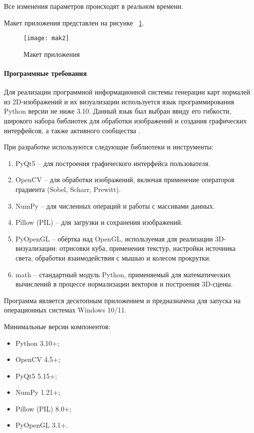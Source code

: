 Все изменения параметров происходят в реальном времени.

Макет приложения представлен на рисунке ~\ref{mak2:image}.

\begin{figure}[ht]
	\texttt{[image: mak2]}
	\caption{Макет приложения}
	\label{mak2:image}
\end{figure}
\paragraph{Программные требования}

Для реализации программной информационной системы генерации карт нормалей из 2D-изображений и их визуализации используется язык программирования Python версии не ниже 3.10. Данный язык был выбран ввиду его гибкости, широкого набора библиотек для обработки изображений и создания графических интерфейсов, а также активного сообщества \cite{ramalho2022}.

При разработке используются следующие библиотеки и инструменты:
\begin{enumerate}
	\item PyQt5 -- для построения графического интерфейса пользователя.
	\item OpenCV -- для обработки изображений, включая применение операторов градиента (Sobel, Scharr, Prewitt).
	\item NumPy -- для численных операций и работы с массивами данных.
	\item Pillow (PIL) -- для загрузки и сохранения изображений.
	\item PyOpenGL -- обёртка над OpenGL, используемая для реализации 3D-визуализации: отрисовки куба, применения текстур, настройки источника света, обработки взаимодействия с мышью и колесом прокрутки.
	\item math -- стандартный модуль Python, применяемый для математических вычислений в процессе нормализации векторов и построения 3D-сцены.
\end{enumerate}

Программа является десктопным приложением и предназначена для запуска на операционных системах Windows 10/11.

Минимальные версии компонентов:
\begin{itemize}
	\item Python 3.10+;
	\item OpenCV 4.5+;
	\item PyQt5 5.15+;
	\item NumPy 1.21+;
	\item Pillow (PIL) 8.0+;
	\item PyOpenGL 3.1+.
\end{itemize}
